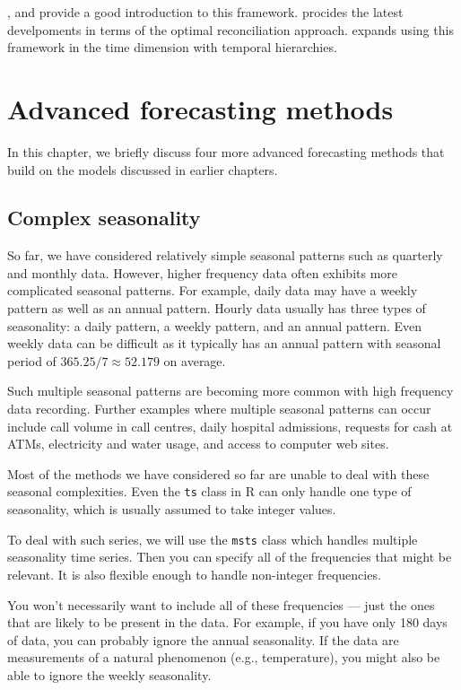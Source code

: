 \documentclass[]{book}
\begin{document}
\citet{HynAth2014}, \citet{AthEtAl2009} and \citet{GroSoh1990} provide a good introduction to this framework. \citet{Mint} procides the latest develpoments in terms of the optimal reconciliation approach. \citet{AthEtAl2017} expands using this framework in the time dimension with temporal hierarchies.

\hypertarget{ch-advanced}{%
\chapter{Advanced forecasting methods}\label{ch-advanced}}

In this chapter, we briefly discuss four more advanced forecasting methods that build on the models discussed in earlier chapters.

\hypertarget{sec:complexseasonality}{%
\section{Complex seasonality}\label{sec:complexseasonality}}

So far, we have considered relatively simple seasonal patterns such as quarterly and monthly data. However, higher frequency data often exhibits more complicated seasonal patterns. For example, daily data may have a weekly pattern as well as an annual pattern. Hourly data usually has three types of seasonality: a daily pattern, a weekly pattern, and an annual pattern. Even weekly data can be difficult as it typically has an annual pattern with seasonal period of \(365.25/7\approx 52.179\) on average.

Such multiple seasonal patterns are becoming more common with high frequency data recording. Further examples where multiple seasonal patterns can occur include call volume in call centres, daily hospital admissions, requests for cash at ATMs, electricity and water usage, and access to computer web sites.

Most of the methods we have considered so far are unable to deal with these seasonal complexities. Even the \texttt{ts} class in R can only handle one type of seasonality, which is usually assumed to take integer values.

To deal with such series, we will use the \texttt{msts} class which handles multiple seasonality time series. Then you can specify all of the frequencies that might be relevant. It is also flexible enough to handle non-integer frequencies.

You won't necessarily want to include all of these frequencies --- just the ones that are likely to be present in the data. For example, if you have only 180 days of data, you can probably ignore the annual seasonality. If the data are measurements of a natural phenomenon (e.g., temperature), you might also be able to ignore the weekly seasonality.
\end{document}
